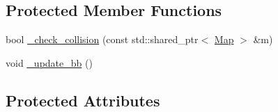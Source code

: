\subsection*{Protected Member Functions}
\begin{DoxyCompactItemize}
\item 
bool \hyperlink{classfastsim_1_1_robot_a96c60c51804db87d38ce66e4cb43cac4}{\+\_\+check\+\_\+collision} (const std\+::shared\+\_\+ptr$<$ \hyperlink{classfastsim_1_1_map}{Map} $>$ \&m)
\item 
void \hyperlink{classfastsim_1_1_robot_a4b5d102337a9df74d67c0f9d388e8a86}{\+\_\+update\+\_\+bb} ()
\end{DoxyCompactItemize}
\subsection*{Protected Attributes}

